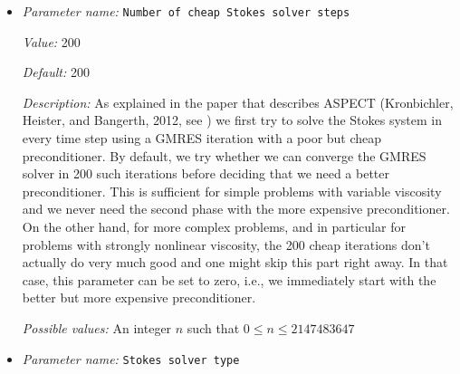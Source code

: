 \begin{itemize}
{\it Value:} 100


{\it Default:} 1000


{\it Description:} This sets the maximum number of iterations used in the expensive Stokes solver. If this value is set too low for the size of the problem, the Stokes solver will not converge and return an error message pointing out that the user didn't allow a sufficiently large number of iterations for the iterative solver to converge.


{\it Possible values:} An integer $n$ such that $0\leq n \leq 2147483647$
\item {\it Parameter name:} {\tt Number of cheap Stokes solver steps}
\label{parameters:Solver parameters/Stokes solver parameters/Number of cheap Stokes solver steps}
\label{parameters:Solver_20parameters/Stokes_20solver_20parameters/Number_20of_20cheap_20Stokes_20solver_20steps}


{\it Value:} 200


{\it Default:} 200


{\it Description:} As explained in the paper that describes ASPECT (Kronbichler, Heister, and Bangerth, 2012, see \cite{KHB12}) we first try to solve the Stokes system in every time step using a GMRES iteration with a poor but cheap preconditioner. By default, we try whether we can converge the GMRES solver in 200 such iterations before deciding that we need a better preconditioner. This is sufficient for simple problems with variable viscosity and we never need the second phase with the more expensive preconditioner. On the other hand, for more complex problems, and in particular for problems with strongly nonlinear viscosity, the 200 cheap iterations don't actually do very much good and one might skip this part right away. In that case, this parameter can be set to zero, i.e., we immediately start with the better but more expensive preconditioner.


{\it Possible values:} An integer $n$ such that $0\leq n \leq 2147483647$
\item {\it Parameter name:} {\tt Stokes solver type}
\label{parameters:Solver parameters/Stokes solver parameters/Stokes solver type}
\label{parameters:Solver_20parameters/Stokes_20solver_20parameters/Stokes_20solver_20type}



\end{itemize}
